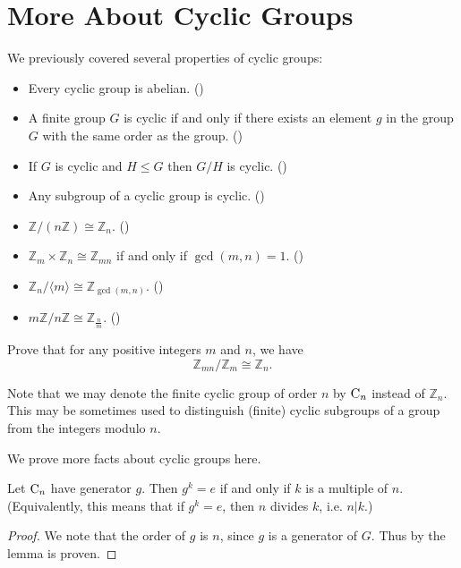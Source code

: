 \section{More About Cyclic Groups}
We previously covered several properties of cyclic groups:
\begin{itemize}
    \item Every cyclic group is abelian. ()
    \item A finite group $G$ is cyclic if and only if there exists an element $g$ in the group $G$ with the same order as the group. ()
    \item If $G$ is cyclic and $H \leq G$ then $G/H$ is cyclic. ()
    \item Any subgroup of a cyclic group is cyclic. ()
    \item $\mathbb{Z} / (n\mathbb{Z}) \cong \mathbb{Z}_n$. ()
    \item $\mathbb{Z}_m \times \mathbb{Z}_n \cong \mathbb{Z}_{mn}$ if and only if $\gcd(m,n) = 1$. ()
    \item $\mathbb{Z}_n / \langle m \rangle \cong \mathbb{Z}_{\gcd(m,n)}$. ()
    \item $m\mathbb{Z} / n\mathbb{Z} \cong \mathbb{Z}_{\frac nm}$. ()
\end{itemize}

\begin{exercise}\label{exercise-Zmn-mod-Zn-cong-Zn}
    Prove that for any positive integers $m$ and $n$, we have
    \[
        \mathbb{Z}_{mn} / \mathbb{Z}_m \cong \mathbb{Z}_n.
    \]
\end{exercise}

Note that we may denote the finite cyclic group of order $n$ by $\mathrm{C}_{n}$ instead of $\mathbb{Z}_n$. This may be sometimes used to distinguish (finite) cyclic subgroups of a group from the integers modulo $n$.

We prove more facts about cyclic groups here.
\begin{lemma}\label{lemma-order-of-an-element-that-is-equivalent-to-identity}
    Let $\mathrm{C}_{n}$ have generator $g$. Then $g^k = e$ if and only if $k$ is a multiple of $n$.\newline
    (Equivalently, this means that if $g^k = e$, then $n$ divides $k$, i.e. $n\vert k$.)
\end{lemma}
\begin{proof}
    We note that the order of $g$ is $n$, since $g$ is a generator of $G$. Thus by  the lemma is proven.
\end{proof}

